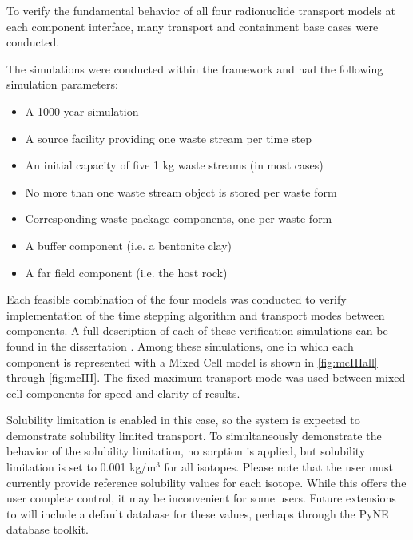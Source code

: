 
To verify the fundamental behavior of all four \Cyder radionuclide transport models at
each component interface, many transport and containment base cases were
conducted.

The simulations were conducted within the \Cyclus framework and had the
following simulation parameters:

\begin{itemize}
\item{A 1000 year simulation}
\item{A source facility providing one waste stream per time step}
\item{An initial capacity of five 1 kg waste streams (in most cases)}
\item{No more than one waste stream object is stored per waste form}
\item{Corresponding waste package components, one per waste form}
\item{A buffer component (i.e. a bentonite clay)}
\item{A far field component (i.e. the host rock)}
\end{itemize}


Each feasible combination of the four models was conducted to verify
implementation of the time stepping algorithm and transport modes between
components. A full description of each of these verification simulations can be 
found in the dissertation \cite{huff_integrated_2013}. Among these simulations, 
one in which each component is represented with a Mixed Cell model is shown in 
\ref{fig:mcIIIall} through \ref{fig:mcIII}.  
The fixed maximum transport mode was used between mixed cell components for speed and clarity of results.

Solubility limitation is enabled 
in this case, so the system is expected to demonstrate solubility limited 
transport.  To simultaneously demonstrate the behavior of the solubility 
limitation, no sorption is applied, but solubility limitation is set to 0.001 
kg/m$^3$ for all isotopes.  Please note that the \Cyder user must currently 
provide reference solubility values for each isotope. While this offers the 
user complete control, it may be inconvenient for some users. Future extensions 
to \Cyder will include a default database for these values, perhaps through the 
\gls{PyNE} database toolkit\cite{bates_pyne_2014}. 



\FloatBarrier


